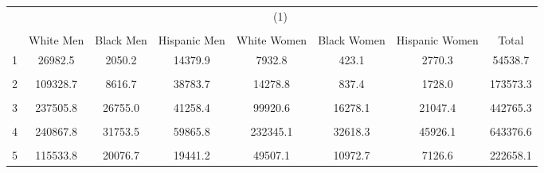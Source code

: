 {
\def\sym#1{\ifmmode^{#1}\else\(^{#1}\)\fi}
\begin{tabular}{l*{7}{c}}
\hline\hline
                    &\multicolumn{7}{c}{(1)}                                                                                                                                  \\
                    &\multicolumn{7}{c}{}                                                                                                                                     \\
                    &   White Men         &   Black Men         &Hispanic Men         & White Women         & Black Women         &Hispanic Women         &       Total         \\
\hline
1                   &     26982.5         &      2050.2         &     14379.9         &      7932.8         &       423.1         &      2770.3         &     54538.7         \\
                    &                     &                     &                     &                     &                     &                     &                     \\
[1em]
2                   &    109328.7         &      8616.7         &     38783.7         &     14278.8         &       837.4         &      1728.0         &    173573.3         \\
                    &                     &                     &                     &                     &                     &                     &                     \\
[1em]
3                   &    237505.8         &     26755.0         &     41258.4         &     99920.6         &     16278.1         &     21047.4         &    442765.3         \\
                    &                     &                     &                     &                     &                     &                     &                     \\
[1em]
4                   &    240867.8         &     31753.5         &     59865.8         &    232345.1         &     32618.3         &     45926.1         &    643376.6         \\
                    &                     &                     &                     &                     &                     &                     &                     \\
[1em]
5                   &    115533.8         &     20076.7         &     19441.2         &     49507.1         &     10972.7         &      7126.6         &    222658.1         \\

\end{tabular}}
